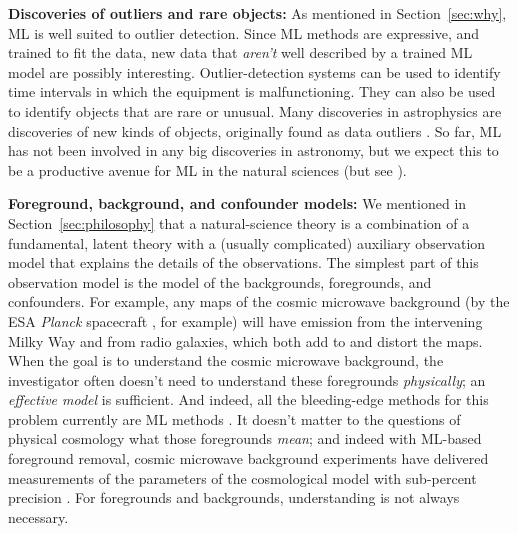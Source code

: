 \documentclass{article}
\renewcommand{\paragraph}[1]{\noindent\par\textbf{#1}}
\newcommand{\sectionname}{Section}
\newcommand{\secref}[1]{\sectionname~\ref{#1}}
\begin{document}
\paragraph{Discoveries of outliers and rare objects:}
As mentioned in \secref{sec:why}, ML is well suited to outlier detection.
Since ML methods are expressive, and trained to fit the data, new data that \emph{aren't} well described by a trained ML model are possibly interesting.
Outlier-detection systems can be used to identify time intervals in which the equipment is malfunctioning.
They can also be used to identify objects that are rare or unusual.
Many discoveries in astrophysics are discoveries of new kinds of objects, originally found as data outliers \cite{quasars, voorwerp}.
So far, ML has not been involved in any big discoveries in astronomy, but we expect this to be a productive avenue for ML in the natural sciences (but see \citealt{contardo}).

\paragraph{Foreground, background, and confounder models:}
We mentioned in \secref{sec:philosophy} that a natural-science theory is a combination of a fundamental, latent theory with a (usually complicated) auxiliary observation model that explains the details of the observations.
The simplest part of this observation model is the model of the backgrounds, foregrounds, and confounders.
For example, any maps of the cosmic microwave background (by the ESA \textsl{Planck} spacecraft \cite{planck_maps}, for example) will have emission from the intervening Milky Way and from radio galaxies, which both add to and distort the maps.
When the goal is to understand the cosmic microwave background, the investigator often doesn't need to understand these foregrounds \emph{physically}; an \emph{effective model} is sufficient.
And indeed, all the bleeding-edge methods for this problem currently are ML methods \cite{cmb_foregrounds}.
It doesn't matter to the questions of physical cosmology what those foregrounds \emph{mean}; and indeed with ML-based foreground removal, cosmic microwave background experiments have delivered measurements of the parameters of the cosmological model with sub-percent precision \cite{planck_parameters}.
For foregrounds and backgrounds, understanding is not always necessary.
\end{document}
